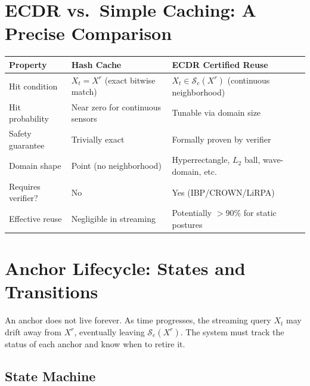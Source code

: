 \documentclass[11pt, a4paper]{article}
\theoremstyle{definition}
\theoremstyle{plain}
\newcommand{\Se}{\mathcal{S}_e}
\begin{document}
\section{ECDR vs.\ Simple Caching: A Precise Comparison}

\begin{center}
\small
\begin{tabularx}{\linewidth}{@{}lYY@{}}
\toprule
Property & Hash Cache & ECDR Certified Reuse \\
\midrule
Hit condition & $X_t = X^r$ (exact bitwise match) & $X_t \in \Se(X^r)$ (continuous neighborhood) \\
Hit probability & Near zero for continuous sensors & Tunable via domain size \\
Safety guarantee & Trivially exact & Formally proven by verifier \\
Domain shape & Point (no neighborhood) & Hyperrectangle, $L_2$ ball, wave-domain, etc. \\
Requires verifier? & No & Yes (IBP/CROWN/LiRPA) \\
Effective reuse & Negligible in streaming & Potentially $>90\%$ for static postures \\
\bottomrule
\end{tabularx}
\end{center}

\section{Anchor Lifecycle: States and Transitions}

An anchor does not live forever. As time progresses, the streaming query $X_t$ may
drift away from $X^r$, eventually leaving $\Se(X^r)$. The system must track the
status of each anchor and know when to retire it.

\subsection{State Machine}
\end{document}
